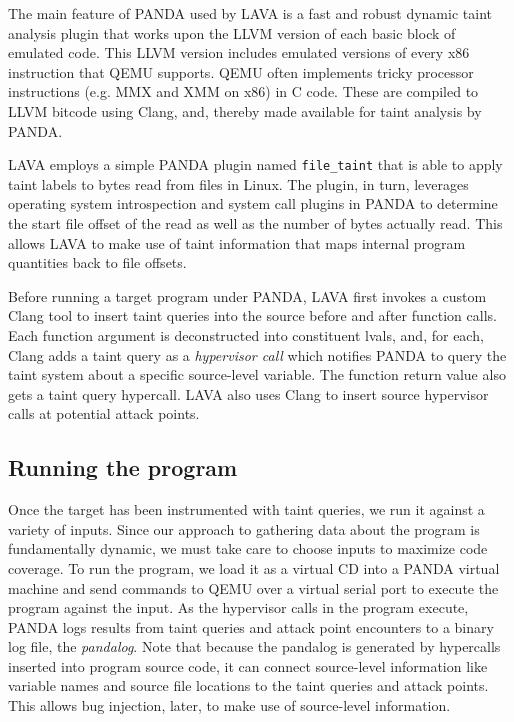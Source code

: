 The main feature of PANDA used by LAVA is a fast and robust dynamic taint analysis plugin that works upon the LLVM version of each 
basic block of emulated code.
This LLVM version includes emulated versions of every x86 instruction that QEMU supports.
QEMU often implements tricky processor instructions (e.g. MMX and XMM on x86) in C code.
These are compiled to LLVM bitcode using Clang, and, thereby made available for taint analysis by PANDA.

LAVA employs a simple PANDA plugin named \verb+file_taint+ that is able to apply taint labels to bytes read from files in Linux.
The plugin, in turn, leverages operating system introspection and system call plugins in PANDA to determine the start file offset of the read as well as the number of bytes actually read.
This allows LAVA to make use of taint information that maps internal program quantities back to file offsets.

Before running a target program under PANDA, LAVA first invokes a custom Clang tool to insert taint queries into the source before and after function calls.
Each function argument is deconstructed into constituent lvals, and, for each, Clang adds a taint query as a \emph{hypervisor call} which notifies PANDA to query the taint system about a specific source-level variable.
The function return value also gets a taint query hypercall.
LAVA also uses Clang to insert source hypervisor calls at potential attack points.

\subsection{Running the program}
Once the target has been instrumented with taint queries, we run it against a variety of inputs.
Since our approach to gathering data about the program is fundamentally dynamic, we must take care to choose inputs to maximize code coverage.
To run the program, we load it as a virtual CD into a PANDA virtual machine and send commands to QEMU over a virtual serial port to execute the program against the input.
As the hypervisor calls in the program execute, PANDA logs results from taint queries and attack point encounters to a binary log file, the \emph{pandalog}.
Note that because the pandalog is generated by hypercalls inserted into program source code, it can connect source-level information like variable names and source file locations to the taint queries and attack points.
This allows bug injection, later, to make use of source-level information. 


